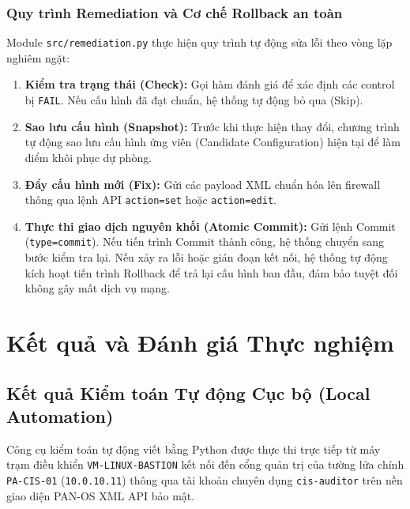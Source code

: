 \documentclass[12pt,a4paper]{article}
\begin{document}
\subsubsection{Quy trình Remediation và Cơ chế Rollback an toàn}
\noindent Module \texttt{src/remediation.py} thực hiện quy trình tự động sửa lỗi theo vòng lặp nghiêm ngặt:
\begin{enumerate}
    \item \textbf{Kiểm tra trạng thái (Check):} Gọi hàm đánh giá để xác định các control bị \texttt{FAIL}. Nếu cấu hình đã đạt chuẩn, hệ thống tự động bỏ qua (Skip).
    \item \textbf{Sao lưu cấu hình (Snapshot):} Trước khi thực hiện thay đổi, chương trình tự động sao lưu cấu hình ứng viên (Candidate Configuration) hiện tại để làm điểm khôi phục dự phòng.
    \item \textbf{Đẩy cấu hình mới (Fix):} Gửi các payload XML chuẩn hóa lên firewall thông qua lệnh API \texttt{action=set} hoặc \texttt{action=edit}.
    \item \textbf{Thực thi giao dịch nguyên khối (Atomic Commit):} Gửi lệnh Commit (\texttt{type=commit}). Nếu tiến trình Commit thành công, hệ thống chuyển sang bước kiểm tra lại. Nếu xảy ra lỗi hoặc gián đoạn kết nối, hệ thống tự động kích hoạt tiến trình Rollback để trả lại cấu hình ban đầu, đảm bảo tuyệt đối không gây mất dịch vụ mạng.
\end{enumerate}

\section{Kết quả và Đánh giá Thực nghiệm}

\subsection{Kết quả Kiểm toán Tự động Cục bộ (Local Automation)}
\noindent Công cụ kiểm toán tự động viết bằng Python được thực thi trực tiếp từ máy trạm điều khiển \texttt{VM-LINUX-BASTION} kết nối đến cổng quản trị của tường lửa chính \texttt{PA-CIS-01} (\texttt{10.0.10.11}) thông qua tài khoản chuyên dụng \texttt{cis-auditor} trên nền giao diện PAN-OS XML API bảo mật.
\end{document}
